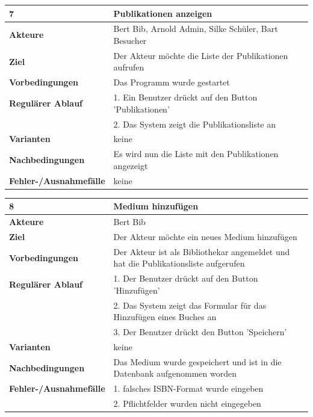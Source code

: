 \documentclass[fontsize=12pt,paper=a4,twoside]{scrartcl}
\begin{document}
\begin{table}[htbp]
\label{7}
\begin{tabular}{|l|p{10cm}|}
\hline 
\textbf{7} & \textbf{Publikationen anzeigen} \\ \hline
\textbf{Akteure} & Bert Bib, Arnold Admin, Silke Schüler, Bart Besucher\\ \hline
\textbf{Ziel} & Der Akteur möchte die Liste der Publikationen aufrufen  \\ \hline
\textbf{Vorbedingungen} & Das Programm wurde gestartet  \\ \hline
\textbf{Regulärer Ablauf} & 
1. Ein Benutzer drückt auf den Button 'Publikationen' \\
&2. Das System zeigt die Publikationsliste an\\
\hline
\textbf{Varianten} & 
keine \\ \hline
\textbf{Nachbedingungen} & Es wird nun die Liste mit den Publikationen angezeigt \\ \hline
\textbf{Fehler-/Ausnahmefälle} & keine\\
\hline
\end{tabular}
\end{table}



\begin{table}[htbp]
\label{8}
\begin{tabular}{|l|p{10cm}|}
\hline 
\textbf{8} & \textbf{Medium hinzufügen} \\ \hline
\textbf{Akteure} & Bert Bib\\ \hline
\textbf{Ziel} & Der Akteur möchte ein neues Medium hinzufügen \\ \hline
\textbf{Vorbedingungen} & Der Akteur ist als Bibliothekar angemeldet und hat die Publikationsliste 
aufgerufen  \\ \hline
\textbf{Regulärer Ablauf} & 
1. Der Benutzer drückt auf den Button 'Hinzufügen' \\
&2. Das System zeigt das Formular für das Hinzufügen eines Buches an\\
&3. Der Benutzer drückt den Button 'Speichern'\\
\hline
\textbf{Varianten} & 
keine \\ \hline
\textbf{Nachbedingungen} & Das Medium wurde gespeichert und ist in die Datenbank aufgenommen 
worden\\ \hline
\textbf{Fehler-/Ausnahmefälle} & 1. falsches ISBN-Format wurde eingeben\\
&2. Pflichtfelder wurden nicht eingegeben\\
\hline
\end{tabular}
\end{table}
\end{document}
